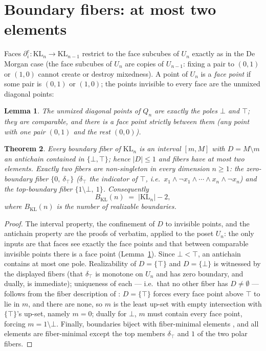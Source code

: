 \documentclass[11pt]{amsart}
\newtheorem{thm}{Theorem}[section]
\newtheorem{lem}[thm]{Lemma}
\theoremstyle{definition}
\newcommand{\KL}{\mathrm{KL}}
\newcommand{\lc}{Q}
\newcommand{\uc}{U}
\newcommand{\bnd}{\partial}
\begin{document}
\section{Boundary fibers: at most two elements}
\label{sec:fibers}

Faces $\bnd_i^e : \KL_n \to \KL_{n-1}$ restrict to the face
subcubes of $\uc_n$ exactly as in the De Morgan case (the face
subcubes of $\uc_n$ are copies of $\uc_{n-1}$: fixing a pair to
$(0,1)$ or $(1,0)$ cannot create or destroy mixedness).  A point of
$\uc_n$ is a \emph{face point} if some pair is $(0,1)$ or $(1,0)$;
the points invisible to every face are the unmixed diagonal
points:

\begin{lem}
  \label{lem:poles}
  The unmixed diagonal points of $\lc_n$ are exactly the poles
  $\bot$ and $\top$; they are comparable, and there is a face point
  strictly between them (any point with one pair $(0,1)$ and the
  rest $(0,0)$).
\end{lem}

\begin{thm}
  \label{thm:fibers}
  Every boundary fiber of $\KL_n$ is an interval $[m, M]$ with
  $D = M \setminus m$ an antichain contained in
  $\{\bot, \top\}$; hence $|D| \leq 1$ and fibers have at most two
  elements.  Exactly two fibers are non-singleton in every
  dimension $n \geq 1$: the \emph{zero-boundary} fiber
  $\{0,\ \delta_{\top}\}$ ($\delta_{\top}$ the indicator of
  $\top$, i.e.\ $x_1 \wedge \neg x_1 \wedge \cdots \wedge x_n
  \wedge \neg x_n$) and the \emph{top-boundary} fiber
  $\{1 \setminus \bot,\ 1\}$.  Consequently
  \[
    B_{\KL}(n) \;=\; |\KL_n| - 2 ,
  \]
  where $B_{\KL}(n)$ is the number of realizable boundaries.
\end{thm}

\begin{proof}
  The interval property, the confinement of $D$ to invisible
  points, and the antichain property are the proofs of
  \cite[\S3]{DMFibers} verbatim, applied to the poset $\uc_n$: the
  only inputs are that faces see exactly the face points and that
  between comparable invisible points there is a face point
  (Lemma~\ref{lem:poles}).  Since $\bot < \top$, an antichain
  contains at most one pole.  Realizability of $D = \{\top\}$ and
  $D = \{\bot\}$ is witnessed by the displayed fibers (that
  $\delta_{\top}$ is monotone on $\uc_n$ and has zero boundary, and
  dually, is immediate); uniqueness of each --- i.e.\ that no other
  fiber has $D \neq \emptyset$ --- follows from the fiber
  description of \cite[Thm.~3.4]{DMFibers}: $D = \{\top\}$ forces
  every face point above $\top$ to lie in $m$, and there are none,
  so $m$ is the least up-set with empty intersection with
  $\{\top\}$'s up-set, namely $m = 0$; dually for $\bot$, $m$ must
  contain every face point, forcing $m = 1 \setminus \bot$.
  Finally, boundaries biject with fiber-minimal elements
  \cite[Thm.~4.2]{DMFibers}, and all elements are fiber-minimal
  except the top members $\delta_{\top}$ and $1$ of the two polar
  fibers.
\end{proof}
\end{document}
